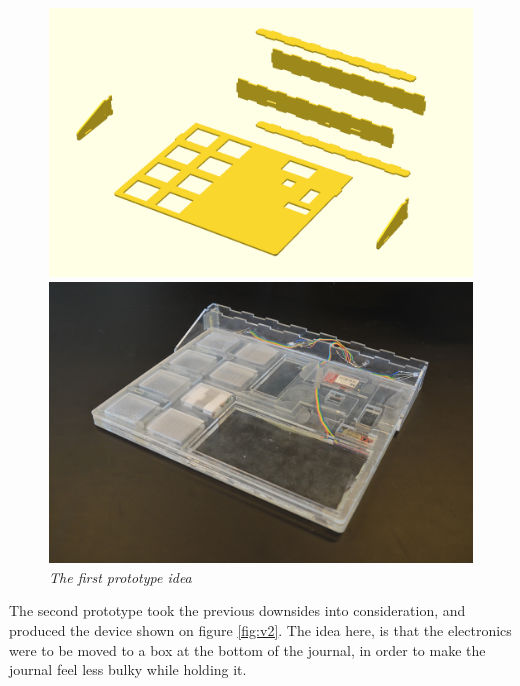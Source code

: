 \begin{figure}[h]
\begin{minipage}[b]{7.5cm}
\centering
\includegraphics[scale=0.235]{figures/iterations/v1.png}
\end{minipage}
\begin{minipage}[b]{7.5cm}
\centering
\includegraphics[scale=0.58]{figures/iterations/v1-photo.jpg}
\end{minipage}
\caption{\small {\it {The first prototype idea}}} \label{fig:v1}
\end{figure}

\clearpage


The second prototype took the previous downsides into consideration, and produced the device shown on figure \ref{fig:v2}. The idea here, is that the electronics were to be moved to a box at the bottom of the journal, in order to make the journal feel less bulky while holding it. \\

